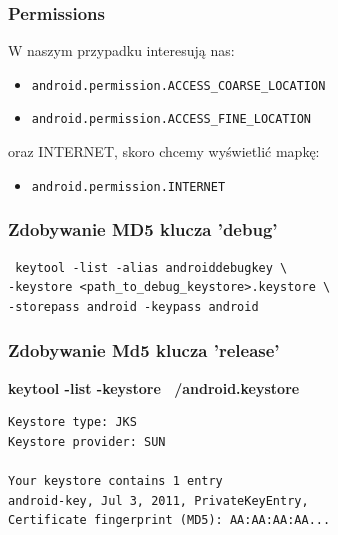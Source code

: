 \documentclass{beamer}
\begin{document}
\begin{frame}[fragile]
 \frametitle{Permissions}

W naszym przypadku interesują nas:

\begin{itemize}
 \item \verb|android.permission.ACCESS_COARSE_LOCATION|
 \item \verb|android.permission.ACCESS_FINE_LOCATION|
\end{itemize}

\pause

oraz INTERNET, skoro chcemy wyświetlić mapkę:
\begin{itemize}
 \item \verb|android.permission.INTERNET|
\end{itemize}

\end{frame}



\begin{frame}[fragile]
 \frametitle{Zdobywanie MD5 klucza 'debug'}
\begin{lstlisting}
 keytool -list -alias androiddebugkey \
-keystore <path_to_debug_keystore>.keystore \
-storepass android -keypass android
\end{lstlisting}
\end{frame}


\begin{frame}[fragile]
\frametitle{Zdobywanie Md5 klucza 'release'}

\textbf{keytool -list -keystore ~/android.keystore }

\begin{lstlisting}
Keystore type: JKS
Keystore provider: SUN

Your keystore contains 1 entry
android-key, Jul 3, 2011, PrivateKeyEntry, 
Certificate fingerprint (MD5): AA:AA:AA:AA...
\end{lstlisting}

\end{frame}
\end{document}
